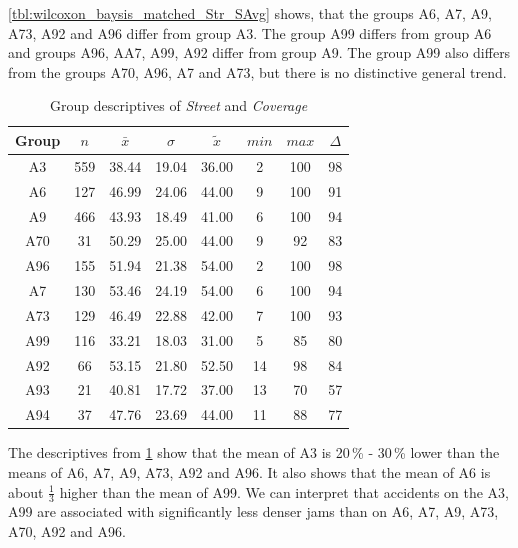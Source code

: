 \cref{tbl:wilcoxon_baysis_matched_Str_SAvg} shows, that the groups A6, A7, A9, A73, A92 and A96 differ from group A3. The group A99 differs from group A6 and groups A96, AA7, A99, A92 differ from group A9. The group A99 also differs from the groups A70, A96, A7 and A73, but there is no distinctive general trend. 
\begin{table}[ht!]
	\tiny
	\centering
	\begin{tabular}{c|c|c|c|c|c|c|c}
	  	\toprule
	 	Group & $n$ & $\bar{x}$ & $\sigma$ & $\tilde{x}$ & $min$ & $max$ & $\Delta$ \\   
	  	\midrule
		A3  & 559 & 38.44 & 19.04 & 36.00 & 2  & 100 & 98 \\ 
	  	A6  & 127 & 46.99 & 24.06 & 44.00 & 9  & 100 & 91 \\ 
	  	A9  & 466 & 43.93 & 18.49 & 41.00 & 6  & 100 & 94 \\ 
	  	A70 & 31  & 50.29 & 25.00 & 44.00 & 9  & 92  & 83 \\ 
	  	A96 & 155 & 51.94 & 21.38 & 54.00 & 2  & 100 & 98 \\ 
	  	A7  & 130 & 53.46 & 24.19 & 54.00 & 6  & 100 & 94 \\ 
	  	A73 & 129 & 46.49 & 22.88 & 42.00 & 7  & 100 & 93 \\ 
	  	A99 & 116 & 33.21 & 18.03 & 31.00 & 5  & 85  & 80 \\ 
	  	A92 & 66  & 53.15 & 21.80 & 52.50 & 14 & 98  & 84 \\ 
	  	A93 & 21  & 40.81 & 17.72 & 37.00 & 13 & 70  & 57 \\ 
	  	A94 & 37  & 47.76 & 23.69 & 44.00 & 11 & 88  & 77 \\ 	
	  	\bottomrule
	\end{tabular}
	\caption{Group descriptives of \textit{Street} and \textit{Coverage}}
	\label{tbl:descriptives_baysis_matched_Str_Cov}
\end{table}
The descriptives from \cref{tbl:descriptives_baysis_matched_Str_Cov} show that the mean of A3 is 20\,\% - 30\,\% lower than the means of A6, A7, A9, A73, A92 and A96. It also shows that the mean of A6 is about $\frac{1}{3}$ higher than the mean of A99. We can interpret that accidents on the A3, A99 are associated with significantly less denser jams than on A6, A7, A9, A73, A70, A92 and A96.

\label{ana:baysis_global_Kat}
 

